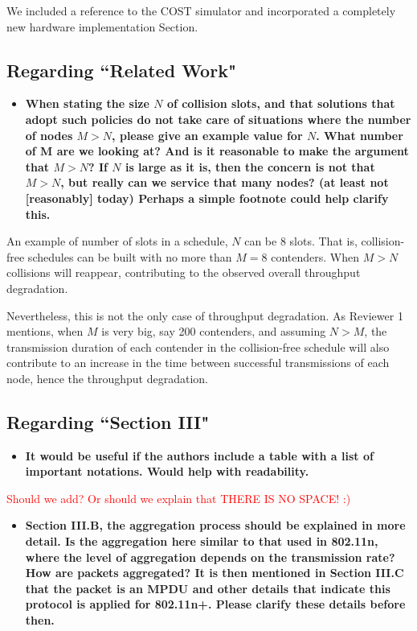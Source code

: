 \documentclass[]{article}
\begin{document}
		We included a reference to the COST simulator and incorporated a completely new hardware implementation Section.
		
	\subsection{Regarding ``Related Work"}
		\begin{itemize}
			\item {\bfseries When stating the size $N$ of  collision slots, and that solutions that adopt such policies do not take care of situations where the number of nodes $M > N$, please give an example value for $N$. What number of M are we looking at? And is it reasonable to make the argument that $M > N$? If $N$ is large as it is, then the concern is not that $M > N$, but really can we service that many nodes? (at least not [reasonably] today) Perhaps a simple footnote could help clarify this.}
		\end{itemize}
		
		An example of number of slots in a schedule, $N$ can be $8$ slots. That is, collision-free schedules can be built with no more than $M=8$ contenders. When $M>N$ collisions will reappear, contributing to the observed overall throughput degradation. 
		
		Nevertheless, this is not the only case of throughput degradation. As Reviewer 1 mentions, when $M$ is very big, say 200 contenders, and assuming $N>M$, the transmission duration of each contender in the collision-free schedule will also contribute to an increase in the time between successful transmissions of each node, hence the throughput degradation.
		
	\subsection{Regarding ``Section III"}
		\begin{itemize}
			\item {\bf It would be useful if the authors include a table with a list of important notations. Would help with readability.}
		\end{itemize}
		\textcolor{red}{Should we add? Or should we explain that THERE IS NO SPACE! :)}

		\begin{itemize}
			\item {\bfseries Section III.B, the aggregation process should be explained in more detail. Is the aggregation here similar to that used in 802.11n, where the level of aggregation depends on the transmission rate? How are packets aggregated? It is then mentioned in Section III.C that the packet is an MPDU and other details that indicate this protocol is applied for 802.11n+. Please clarify these details before then.}
		\end{itemize}
		
\end{document}
